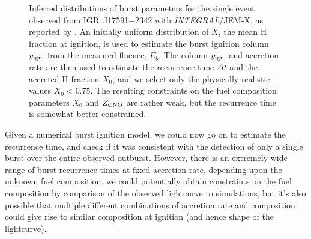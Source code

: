 \documentclass{aastex63}
\newcommand{\Xb}{\ensuremath{\overline{X}}}
\newcommand{\yign}{y_{\rm ign}}
\newcommand{\zcno}{Z_{\rm CNO}}
\newcommand{\igr}{{\it INTEGRAL}}
\begin{document}
\begin{figure}[ht!]
\caption{Inferred distributions of burst parameters for the single event observed from IGR~J17591$-$2342 with \igr/JEM-X, as reported by \cite{kuiper20}. An initially uniform distribution of \Xb, the mean H fraction at ignition, is used to estimate the burst ignition column $\yign$\ from the measured fluence, $E_b$. The column $\yign$\ and accretion rate are then used to estimate the recurrence time $\Delta t$ and the accreted H-fraction $X_0$, and we select only the physically realistic values $X_0<0.75$. The resulting constraints on the fuel composition parameters $X_0$ and $\zcno$ are rather weak, but the recurrence time is somewhat better constrained.
\label{fig:param_igr17591}}
\end{figure}


Given a numerical burst ignition model, we could now go on to estimate the recurrence time, and check if it was consistent with the detection of only a single burst over the entire observed outburst. However, there is an extremely wide range of burst recurrence times at fixed accretion rate, depending upon the unknown fuel composition. we could potentially obtain constraints on the fuel composition by comparison of the observed lightcurve to simulations, but it's also possible that multiple different combinations of accretion rate and composition could give rise to similar composition at ignition (and hence shape of the lightcurve).
\end{document}
